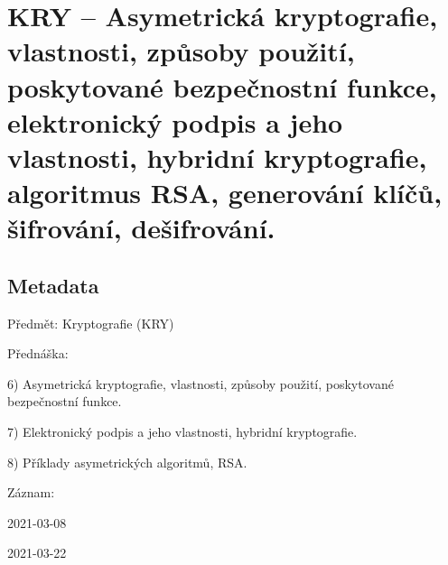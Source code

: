 

\graphicspath{{kry/asymetricka_kryptografie/figures}}


\chapter{KRY -- Asymetrická kryptografie, vlastnosti, způsoby použití, poskytované bezpečnostní funkce, elektronický podpis a jeho vlastnosti, hybridní kryptografie, algoritmus RSA, generování klíčů, šifrování, dešifrování.}



\section{Metadata}

\begin{compactitem}
    \item Předmět: Kryptografie (KRY)
    \item Přednáška:
    \begin{compactitem}
        \item 6) Asymetrická kryptografie, vlastnosti, způsoby použití, poskytované bezpečnostní funkce.
        \item 7) Elektronický podpis a jeho vlastnosti, hybridní kryptografie.
        \item 8) Příklady asymetrických algoritmů, RSA.
    \end{compactitem}
    \item Záznam:
    \begin{compactitem}
        \item 2021-03-08
        \item 2021-03-22
    \end{compactitem}
\end{compactitem}


